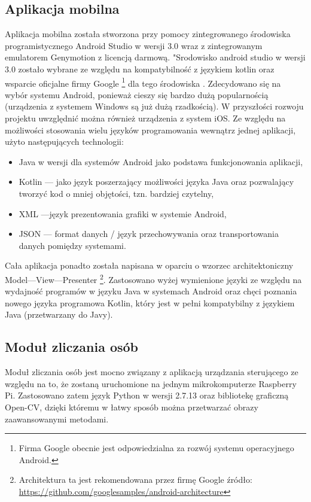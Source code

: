 \subsection{Aplikacja mobilna}
Aplikacja mobilna została stworzona przy pomocy zintegrowanego środowiska programistycznego Android Studio w wersji 3.0 wraz z zintegrowanym emulatorem Genymotion z licencją darmową. "Srodowisko android studio w wersji 3.0 zostało wybrane ze względu na kompatybilność z językiem kotlin oraz wsparcie oficjalne firmy Google
 \footnote{Firma Google obecnie jest odpowiedzialna za rozwój systemu operacyjnego Android.}
 dla tego środowiska . Zdecydowano się na wybór systemu Android, ponieważ cieszy się bardzo dużą popularnością (urządzenia z systemem Windows są już dużą rzadkością). W przyszłości rozwoju projektu uwzględnić można również urządzenia z system iOS. Ze względu na możliwości stosowania wielu języków programowania wewnątrz jednej aplikacji, użyto następujących technologii:
\begin{itemize}
	\item Java w wersji dla systemów Android jako podstawa funkcjonowania aplikacji,
	\item Kotlin --- jako język poszerzający możliwości języka Java oraz pozwalający tworzyć kod o mniej objętości, tzn. bardziej czytelny,
	\item XML ---język prezentowania grafiki w systemie Android,
	\item JSON --- format danych / język przechowywania oraz transportowania danych pomiędzy systemami.
\end{itemize}
Cała aplikacja ponadto została napisana w oparciu o wzorzec architektoniczny Model---View---Presenter \footnote{ Architektura ta jest rekomendowana przez firmę Google
źródło: \\ \href{https://github.com/googlesamples/android-architecture}{https://github.com/googlesamples/android-architecture}}. Zastosowano wyżej wymienione języki ze względu na wydajność programów w języku Java w systemach Android oraz chęci poznania nowego języka programowa Kotlin, który jest w pełni kompatybilny z językiem Java (przetwarzany do Javy).  

\subsection{Moduł zliczania osób}
Moduł zliczania osób jest mocno związany z aplikacją urządzania sterującego ze względu na to, że zostaną uruchomione na jednym mikrokomputerze Raspberry Pi. Zastosowano zatem język Python w wersji 2.7.13 oraz bibliotekę graficzną Open-CV, dzięki któremu w łatwy sposób można przetwarzać obrazy zaawansowanymi metodami. 

